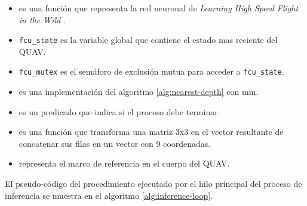 \begin{itemize}
    \item {} es una función que representa la red neuronal de \textit{Learning High Speed Flight in the Wild} \cite{Loquercio2021}.
    \item \texttt{fcu\_state} es la variable global que contiene el estado mas reciente del QUAV.
    \item \texttt{fcu\_mutex} es el semáforo de exclusión mutua para acceder a \texttt{fcu\_state}.
    \item {} es una implementación del algoritmo \ref{alg:nearest-depth} con  mm.
    \item {} es un predicado que indica si el proceso debe terminar.
    \item {} es una función que transforma una matriz 3x3 en el vector resultante de concatenar sus filas en un vector con 9 coordenadas.
    \item {} representa el marco de referencia en el cuerpo del QUAV.
\end{itemize}

El pseudo-código del procedimiento ejecutado por el hilo principal del proceso de inferencia se muestra en el algoritmo \ref{alg:inference-loop}.

